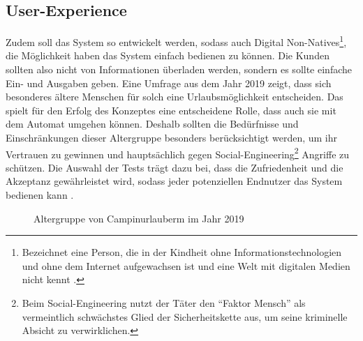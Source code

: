 \subsection{User-Experience}
Zudem soll das System so entwickelt werden, sodass auch Digital Non-Natives\footnote{Bezeichnet
eine Person, die in der Kindheit ohne Informationstechnologien und ohne dem Internet aufgewachsen ist 
und eine Welt mit digitalen Medien nicht kennt \cite{misc:MSND}.}, die Möglichkeit \cite{refart:QWDN} haben
das System einfach bedienen zu können. Die Kunden sollten also nicht von Informationen überladen werden, 
sondern es sollte einfache Ein- und Ausgaben geben. Eine Umfrage aus dem Jahr 2019 \cite{periodical:AdCJ}
zeigt, dass sich besonderes ältere Menschen \cite{periodical:AdCJ} für solch eine Urlaubsmöglichkeit entscheiden.
Das spielt für den Erfolg des Konzeptes eine entscheidene Rolle, dass auch sie mit dem Automat umgehen können. 
Deshalb sollten die Bedürfnisse und Einschränkungen dieser Altergruppe besonders berücksichtigt werden, um ihr 
Vertrauen zu gewinnen \cite{refart:HLAU} und hauptsächlich gegen Social-Engineering\footnote{Beim Social-Engineering 
nutzt der Täter den ``Faktor Mensch'' als vermeintlich schwächstes Glied der Sicherheitskette aus, um seine kriminelle
Absicht zu verwirklichen.\cite{booklet:BSSE}} Angriffe zu schützen. Die Auswahl der Tests trägt dazu bei, dass die 
Zufriedenheit und die Akzeptanz gewährleistet wird, sodass jeder potenziellen Endnutzer das System bedienen kann 
\cite{refbook:IASE}.


\vfill
\begin{figure}[H]
    \caption{Altergruppe von Campinurlauberm im Jahr 2019\cite{periodical:AdCJ}}
    \label{fig:periodical_AdCJ}
\end{figure}


